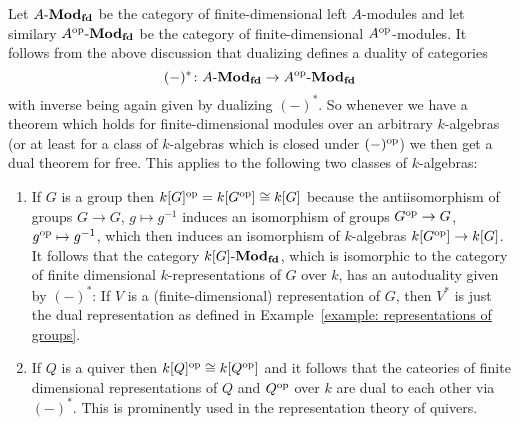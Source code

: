 \begin{example}
  Let $A\text{-}\mathbf{Mod}_{\mathbf{fd}}$ be the category of finite-dimensional left $A$-modules and let similary $A^{\operatorname{op}}\text{-}\mathbf{Mod}_{\mathbf{fd}}$ be the category of finite-dimensional $A^{\operatorname{op}}$-modules.
  It follows from the above discussion that dualizing defines a duality of categories
  \[
            (-)^*
    \colon  A\text{-}\mathbf{Mod}_{\mathbf{fd}}
    \to     A^{\operatorname{op}}\text{-}\mathbf{Mod}_{\mathbf{fd}}
  \]
  with inverse being again given by dualizing $(-)^*$.
  So whenever we have a theorem which holds for finite-dimensional modules over an arbitrary $k$-algebras (or at least for a class of $k$-algebras which is closed under $(-)^{\operatorname{op}}$) we then get a dual theorem for free.
  This applies to the following two classes of $k$-algebras:
  \begin{enumerate}
    \item
      If $G$ is a group then $k[G]^{\operatorname{op}} = k[G^{\operatorname{op}}] \cong k[G]$ because the antiisomorphism of groups $G \to G$, $g \mapsto g^{-1}$ induces an isomorphism of groups $G^{\operatorname{op}} \to G$, $g^{\operatorname{op}} \mapsto g^{-1}$, which then induces an isomorphism of $k$-algebras $k[G^{\operatorname{op}}] \to k[G]$.
      It follows that the category $k[G]\text{-}\mathbf{Mod}_{\mathbf{fd}}$, which is isomorphic to the category of finite dimensional $k$-representations of $G$ over $k$, has an autoduality given by $(-)^*$:
      If $V$ is a (finite-dimensional) representation of $G$, then $V^*$ is just the dual representation as defined in Example~\ref{example: representations of groups}.
    \item
      If $Q$ is a quiver then $k[Q]^{\operatorname{op}} \cong k[Q^{\operatorname{op}}]$ and it follows that the cateories of finite dimensional representations of $Q$ and $Q^{\operatorname{op}}$ over $k$ are dual to each other via $(-)^*$.
      This is prominently used in the representation theory of quivers.
  \end{enumerate}
\end{example}




